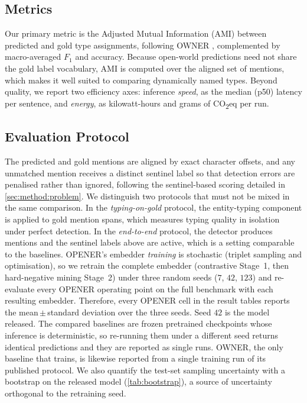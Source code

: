 \subsection{Metrics}
\label{sec:exp:metrics}
Our primary metric is the Adjusted Mutual Information (AMI) \cite{vinh2010ami} between predicted and gold type assignments, following OWNER \cite{genest2025owner}, complemented by macro-averaged $F_1$ and accuracy.
Because open-world predictions need not share the gold label vocabulary, AMI is computed over the aligned set of mentions, which makes it well suited to comparing dynamically named types.
Beyond quality, we report two efficiency axes: inference \emph{speed}, as the median (p50) latency per sentence, and \emph{energy}, as kilowatt-hours and grams of CO\textsubscript{2}eq per run.

\subsection{Evaluation Protocol}
\label{sec:exp:protocol}
The predicted and gold mentions are aligned by exact character offsets, and any unmatched mention receives a distinct sentinel label so that detection errors are penalised rather than ignored, following the sentinel-based scoring detailed in \autoref{sec:method:problem}.
We distinguish two protocols that must not be mixed in the same comparison.
In the \emph{typing-on-gold} protocol, the entity-typing component is applied to gold mention spans, which measures typing quality in isolation under perfect detection.
In the \emph{end-to-end} protocol, the detector produces mentions and the sentinel labels above are active, which is a setting comparable to the baselines.
OPENER's embedder \emph{training} is stochastic (triplet sampling and optimisation), so we retrain the complete embedder (contrastive Stage~1, then hard-negative mining Stage~2) under three random seeds ($7$, $42$, $123$) and re-evaluate every OPENER operating point on the full benchmark with each resulting embedder.
Therefore, every OPENER cell in the result tables reports the mean\,$\pm$\,standard deviation over the three seeds. Seed $42$ is the model released.
The compared baselines are frozen pretrained checkpoints whose inference is deterministic, so re-running them under a different seed returns identical predictions and they are reported as single runs. OWNER, the only baseline that trains, is likewise reported from a single training run of its published protocol.
We also quantify the test-set sampling uncertainty with a bootstrap on the released model (\autoref{tab:bootstrap}), a source of uncertainty orthogonal to the retraining seed.

